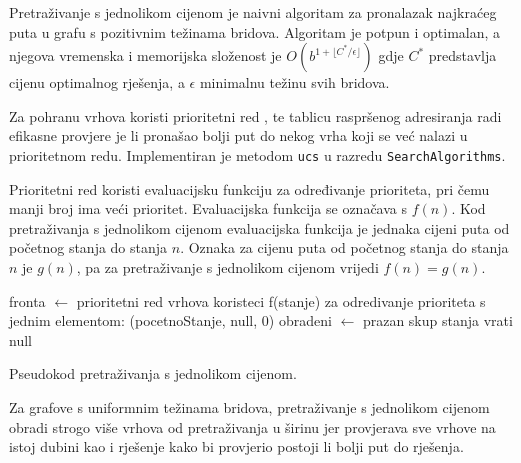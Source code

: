 Pretraživanje s jednolikom cijenom  je naivni algoritam za pronalazak najkraćeg puta u grafu s pozitivnim težinama bridova.
Algoritam je potpun i optimalan, a njegova vremenska i memorijska složenost je \( O \left (b^{1 + \lfloor {C^*}/{\epsilon} \rfloor} \right ) \) gdje \( C^* \) predstavlja cijenu optimalnog rješenja, a \( \epsilon \) minimalnu težinu svih bridova. \cite{russelNorvig2003:aima}

Za pohranu vrhova koristi prioritetni red , te tablicu raspršenog adresiranja radi efikasne provjere je li pronašao bolji put do nekog vrha koji se već nalazi u prioritetnom redu.
Implementiran je metodom \texttt{ucs} u razredu \texttt{SearchAlgorithms}.

Prioritetni red koristi evaluacijsku funkciju  za određivanje prioriteta, pri čemu manji broj ima veći prioritet. 
Evaluacijska funkcija se označava s \( f(n) \).
Kod pretraživanja s jednolikom cijenom evaluacijska funkcija je jednaka cijeni puta od početnog stanja do stanja \( n \). 
Oznaka za cijenu puta od početnog stanja do stanja \( n \) je \( g(n) \), pa za pretraživanje s jednolikom cijenom vrijedi \( f(n) = g(n) \).

\begin{algorithm}[h]
	fronta $\gets$ prioritetni red vrhova koristeci f(stanje) za odredivanje prioriteta s jednim elementom: (pocetnoStanje, null, 0)\;
	obradeni $\gets$ prazan skup stanja\;
	vrati null\;
	\caption{Pseudokod pretraživanja s jednolikom cijenom.}
\end{algorithm}

Za grafove s uniformnim težinama bridova, pretraživanje s jednolikom cijenom obradi strogo više vrhova od pretraživanja u širinu jer provjerava sve vrhove na istoj dubini kao i rješenje kako bi provjerio postoji li bolji put do rješenja. 

